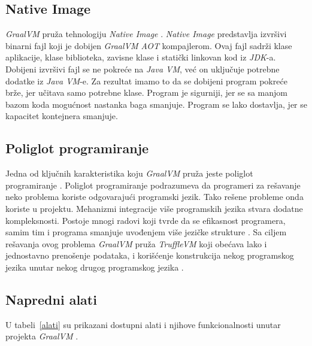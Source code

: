 \documentclass[a4paper]{article}
\begin{document}
\subsection{Native Image}
\label{sub:nim}

\emph{GraalVM} pruža tehnologiju \emph{Native Image} \cite{graalvm}. \emph{Native Image} predstavlja izvršivi binarni fajl koji je dobijen \emph{GraalVM AOT} kompajlerom. Ovaj fajl sadrži klase aplikacije, klase biblioteka, zavisne klase i statički linkovan kod iz \emph{JDK}-a. Dobijeni izvršivi fajl se ne pokreće na \emph{Java VM}, već on uključuje potrebne dodatke iz \emph{Java VM}-e. Za rezultat imamo to da se dobijeni program pokreće brže, jer učitava samo potrebne klase. Program je sigurniji, jer se sa manjom bazom koda mogućnost nastanka baga smanjuje. Program se lako dostavlja, jer se kapacitet kontejnera smanjuje.

\subsection{Poliglot programiranje}
\label{sub:poliglot}

Jedna od ključnih karakteristika koju \emph{GraalVM} pruža jeste poliglot programiranje \cite{graalvm}. Poliglot programiranje podrazumeva da programeri za rešavanje neko problema koriste odgovarajući programski jezik. Tako rešene probleme onda koriste u projektu. Mehanizmi integracije više programskih jezika stvara dodatne kompleksnosti. Postoje mnogi radovi koji tvrde da se efikasnost programera, samim tim i programa smanjuje uvođenjem više jezičke strukture \cite{peterson21, hao20}. Sa ciljem rešavanja ovog problema \emph{GraalVM} pruža \emph{TruffleVM} koji obećava lako i jednostavno prenošenje podataka, i korišćenje konstrukcija nekog programskog jezika unutar nekog drugog programskog jezika \cite{grimmer15}.

\subsection{Napredni alati}
\label{sub:alati}

U tabeli~\ref{alati} su prikazani dostupni alati i njihove funkcionalnosti unutar projekta \emph{GraalVM} \cite{graalvm}.
\end{document}

